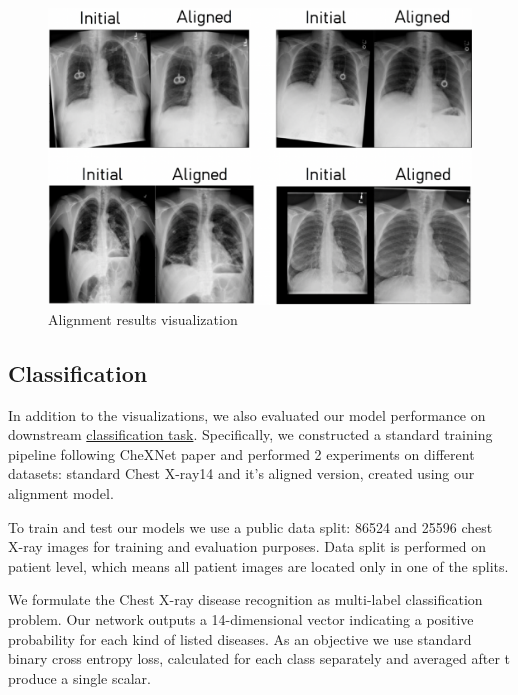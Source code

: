 \documentclass{article}
\begin{document}
\begin{figure}[ht]\label{visualization}
     \vskip 0.2in
     \begin{center}
     \centerline{\includegraphics[width=\columnwidth]{../images/alignment_results.png}}
     \caption{Alignment results visualization}
     \end{center}
     \vskip -0.2in
\end{figure}

 
\subsection{Classification}
 
In addition to the visualizations, we also evaluated our model performance 
 on downstream \href{https://paperswithcode.com/sota/multi-label-classification-on-chestx-ray14}{classification task}. 
 Specifically, we constructed a standard training pipeline following CheXNet 
 paper \cite{CheXNet} and performed 2 experiments on different datasets: standard Chest X-ray14 
 and it's aligned version, created using our alignment model.



To train and test our models we use a public data split: 86524 and 25596 chest 
X-ray images for training and evaluation purposes. Data split is performed on 
patient level, which means all patient images are located only in one of the 
splits.

We formulate the Chest X-ray disease recognition as multi-label classification 
problem. Our network outputs a 14-dimensional vector indicating a positive 
probability for each kind of listed diseases. As an objective we use standard 
binary cross entropy loss, calculated for each class separately and averaged 
after t produce a single scalar.
\end{document}
